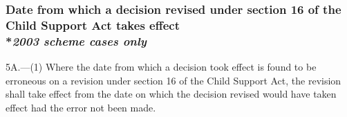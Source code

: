\documentclass[12pt,a4paper]{article}
\begin{document}

\subsubsection[5A. Date from which a decision revised under section 16 of the Child Support Act takes effect]{Date from which a decision revised under section 16 of the Child Support Act takes effect\\*\emph{2003 scheme cases only}}

5A.---(1)  Where the date from which a decision took effect is found to be erroneous on a revision under section 16 of the Child Support Act, the revision shall take effect from the date on which the decision revised would have taken effect had the error not been made.
\end{document}
